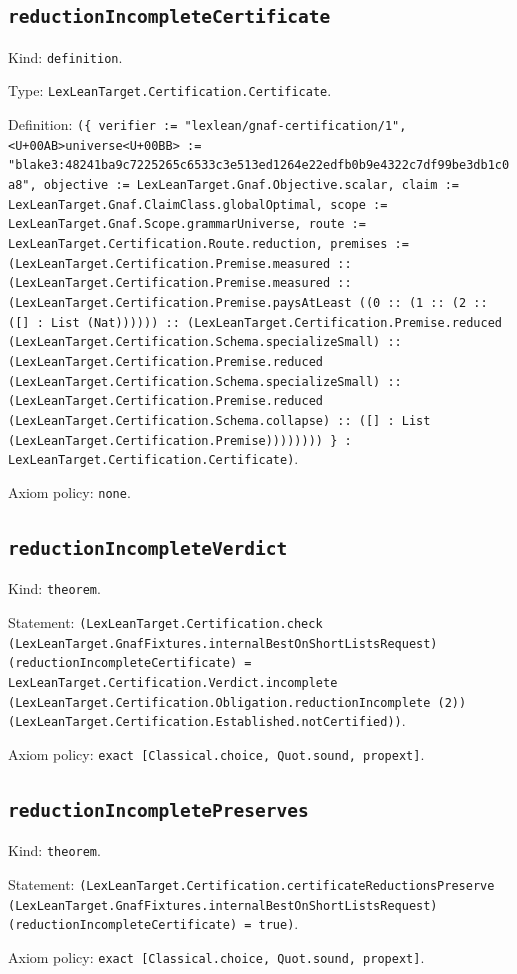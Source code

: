 \documentclass[11pt]{article}
\begin{document}
\subsection*{\texttt{reductionIncompleteCertificate}}
\noindent Kind: \texttt{definition}.\par
\noindent Type: \texttt{LexLeanTarget.Certification.Certificate}.\par
\noindent Definition: \texttt{(\{ verifier := "lexlean/gnaf-certification/1", <U+00AB>universe<U+00BB> := "blake3:48241ba9c7225265c6533c3e513ed1264e22edfb0b9e4322c7df99be3db1c0a8", objective := LexLeanTarget.Gnaf.Objective.scalar, claim := LexLeanTarget.Gnaf.ClaimClass.globalOptimal, scope := LexLeanTarget.Gnaf.Scope.grammarUniverse, route := LexLeanTarget.Certification.Route.reduction, premises := (LexLeanTarget.Certification.Premise.measured :: (LexLeanTarget.Certification.Premise.measured :: (LexLeanTarget.Certification.Premise.paysAtLeast ((0 :: (1 :: (2 :: ([] : List (Nat)))))) :: (LexLeanTarget.Certification.Premise.reduced (LexLeanTarget.Certification.Schema.specializeSmall) :: (LexLeanTarget.Certification.Premise.reduced (LexLeanTarget.Certification.Schema.specializeSmall) :: (LexLeanTarget.Certification.Premise.reduced (LexLeanTarget.Certification.Schema.collapse) :: ([] : List (LexLeanTarget.Certification.Premise)))))))) \} : LexLeanTarget.Certification.Certificate)}.\par
\noindent Axiom policy: \texttt{none}.\par
\subsection*{\texttt{reductionIncompleteVerdict}}
\noindent Kind: \texttt{theorem}.\par
\noindent Statement: \texttt{(LexLeanTarget.Certification.check (LexLeanTarget.GnafFixtures.internalBestOnShortListsRequest) (reductionIncompleteCertificate) = LexLeanTarget.Certification.Verdict.incomplete (LexLeanTarget.Certification.Obligation.reductionIncomplete (2)) (LexLeanTarget.Certification.Established.notCertified))}.\par
\noindent Axiom policy: \texttt{exact [Classical.choice, Quot.sound, propext]}.\par
\subsection*{\texttt{reductionIncompletePreserves}}
\noindent Kind: \texttt{theorem}.\par
\noindent Statement: \texttt{(LexLeanTarget.Certification.certificateReductionsPreserve (LexLeanTarget.GnafFixtures.internalBestOnShortListsRequest) (reductionIncompleteCertificate) = true)}.\par
\noindent Axiom policy: \texttt{exact [Classical.choice, Quot.sound, propext]}.\par
\end{document}
